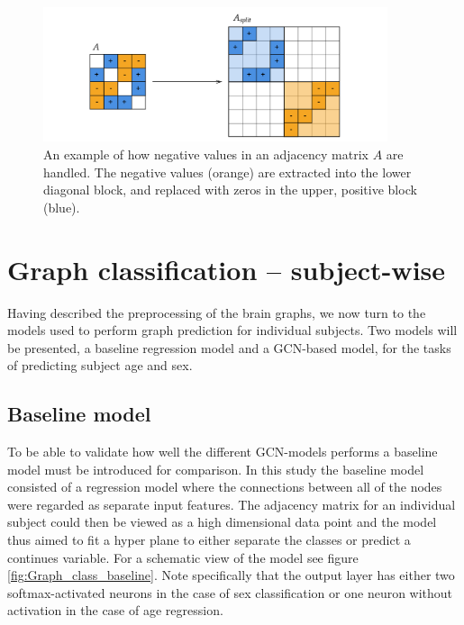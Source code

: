 \begin{figure}[H]
    \centering
    \includegraphics[width=0.9\textwidth]{chapters/images_methods/split.png}
    \caption{An example of how negative values in an adjacency matrix $A$ are handled. The negative values (orange) are extracted into the lower diagonal block, and replaced with zeros in the upper, positive block (blue).}
    \label{fig:block_diagonal_adjacency_matrix}
\end{figure}

\section{Graph classification -- subject-wise}

Having described the preprocessing of the brain graphs, we now turn to the models used to perform graph prediction for individual subjects. Two models will be presented, a baseline regression model and a GCN-based model, for the tasks of predicting subject age and sex.

\subsection{Baseline model}
To be able to validate how well the different GCN-models performs a baseline model must be introduced for comparison. In this study the baseline model consisted of a regression model where the connections between all of the nodes were regarded as separate input features. The adjacency matrix for an individual subject could then be viewed as a high dimensional data point and the model thus aimed to fit a hyper plane to either separate the classes or predict a continues variable. For a schematic view of the model see figure \ref{fig:Graph_class_baseline}. Note specifically that the output layer has either two softmax-activated neurons in the case of sex classification or one neuron without activation in the case of age regression. 

